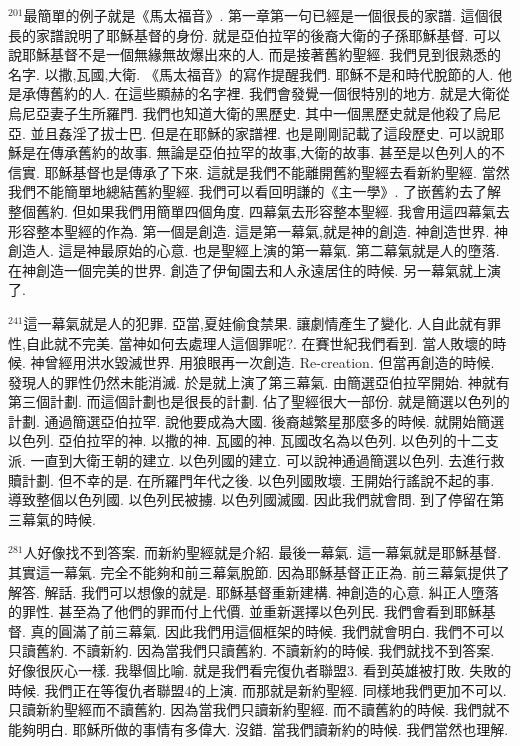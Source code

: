 \documentclass{book}
\begin{document}
$^{201}$最簡單的例子就是《馬太福音》.
第一章第一句已經是一個很長的家譜.
這個很長的家譜說明了耶穌基督的身份.
就是亞伯拉罕的後裔大衛的子孫耶穌基督.
可以說耶穌基督不是一個無緣無故爆出來的人.
而是接著舊約聖經.
我們見到很熟悉的名字.
以撒,瓦國,大衛.
《馬太福音》的寫作提醒我們.
耶穌不是和時代脫節的人.
他是承傳舊約的人.
在這些顯赫的名字裡.
我們會發覺一個很特別的地方.
就是大衛從烏尼亞妻子生所羅門.
我們也知道大衛的黑歷史.
其中一個黑歷史就是他殺了烏尼亞.
並且姦淫了拔士巴.
但是在耶穌的家譜裡.
也是剛剛記載了這段歷史.
可以說耶穌是在傳承舊約的故事.
無論是亞伯拉罕的故事,大衛的故事.
甚至是以色列人的不信實.
耶穌基督也是傳承了下來.
這就是我們不能離開舊約聖經去看新約聖經.
當然我們不能簡單地總結舊約聖經.
我們可以看回明謙的《主一學》.
了嵌舊約去了解整個舊約.
但如果我們用簡單四個角度.
四幕氣去形容整本聖經.
我會用這四幕氣去形容整本聖經的作為.
第一個是創造.
這是第一幕氣,就是神的創造.
神創造世界.
神創造人.
這是神最原始的心意.
也是聖經上演的第一幕氣.
第二幕氣就是人的墮落.
在神創造一個完美的世界.
創造了伊甸園去和人永遠居住的時候.
另一幕氣就上演了.

$^{241}$這一幕氣就是人的犯罪.
亞當,夏娃偷食禁果.
讓劇情產生了變化.
人自此就有罪性,自此就不完美.
當神如何去處理人這個罪呢?.
在賽世紀我們看到.
當人敗壞的時候.
神曾經用洪水毀滅世界.
用狼眼再一次創造.
Re-creation.
但當再創造的時候.
發現人的罪性仍然未能消滅.
於是就上演了第三幕氣.
由簡選亞伯拉罕開始.
神就有第三個計劃.
而這個計劃也是很長的計劃.
佔了聖經很大一部份.
就是簡選以色列的計劃.
通過簡選亞伯拉罕.
說他要成為大國.
後裔越繁星那麼多的時候.
就開始簡選以色列.
亞伯拉罕的神.
以撒的神.
瓦國的神.
瓦國改名為以色列.
以色列的十二支派.
一直到大衛王朝的建立.
以色列國的建立.
可以說神通過簡選以色列.
去進行救贖計劃.
但不幸的是.
在所羅門年代之後.
以色列國敗壞.
王開始行謠說不起的事.
導致整個以色列國.
以色列民被擄.
以色列國滅國.
因此我們就會問.
到了停留在第三幕氣的時候.

$^{281}$人好像找不到答案.
而新約聖經就是介紹.
最後一幕氣.
這一幕氣就是耶穌基督.
其實這一幕氣.
完全不能夠和前三幕氣脫節.
因為耶穌基督正正為.
前三幕氣提供了解答.
解話.
我們可以想像的就是.
耶穌基督重新建構.
神創造的心意.
糾正人墮落的罪性.
甚至為了他們的罪而付上代價.
並重新選擇以色列民.
我們會看到耶穌基督.
真的圓滿了前三幕氣.
因此我們用這個框架的時候.
我們就會明白.
我們不可以只讀舊約.
不讀新約.
因為當我們只讀舊約.
不讀新約的時候.
我們就找不到答案.
好像很灰心一樣.
我舉個比喻.
就是我們看完復仇者聯盟3.
看到英雄被打敗.
失敗的時候.
我們正在等復仇者聯盟4的上演.
而那就是新約聖經.
同樣地我們更加不可以.
只讀新約聖經而不讀舊約.
因為當我們只讀新約聖經.
而不讀舊約的時候.
我們就不能夠明白.
耶穌所做的事情有多偉大.
沒錯.
當我們讀新約的時候.
我們當然也理解.
\end{document}
